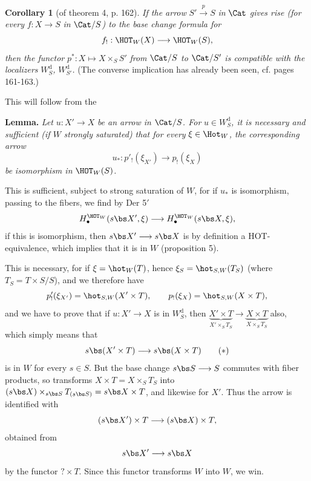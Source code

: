 \noindent{}%
\textbf{Corollary 1} (of theorem 4, p. 162). \textit{If the arrow} $S' \xrightarrow{p} S$ \textit{in} $\Cat$ \textit{gives rise (for every} $f : X \longrightarrow S$ \textit{in} $\Cat/S$\textit{) to the base change formula for}
\[
f_! : \HOT_W(X) \longrightarrow \HOT_W(S),
\]
\textit{then the functor} $p^* : X \longmapsto X \times_S S'$ \textit{from} $\Cat/S$ \textit{to} $\Cat/S'$ \textit{is compatible with the localizers} $W^{\mathrm{d}}_{S}$\textit{,} $W^{\mathrm{d}}_{S'}$\textit{.} (The converse implication has already been seen, cf. pages 161-163.)

This will follow from the

\noindent\textbf{Lemma.} \textit{Let} $u : X' \longrightarrow X$ \textit{be an arrow in} $\Cat/S$\textit{. For} $u \in W^{\mathrm{d}}_{S}$\textit{, it is necessary and sufficient (if $W$} \textit{strongly saturated) that for every} $\xi \in \Hot_W$\textit{, the corresponding arrow}
\[
u_* : p'_!(\xi_{X'}) \longrightarrow p_!(\xi_X)
\]
\textit{be} \textit{isomorphism in} $\HOT_W(S)$\textit{.}

This is sufficient, subject to strong saturation of $W$, for if $u_*$ is isomorphism, passing to the fibers, we find by Der 5$'$
\[
H_\bullet^{\HOT_W}(s\bs X', \xi) \longrightarrow H_\bullet^{\HOT_W}(s\bs X, \xi),
\]
if this is isomorphism, then $s\bs X' \longrightarrow s\bs X$ is by definition a HOT-equivalence, which implies that it is in $W$ (proposition 5).

This is necessary, for if $\xi = \hot_W(T)$, hence $\xi_S = \hot_{S,W}(T_S)$ (where $T_S = T \times S/S$), and we therefore have
\[
p'_!(\xi_{X'}) = \hot_{S,W}(X' \times T), \qquad p_!(\xi_X) = \hot_{S,W}(X \times T),
\]
and we have to prove that if $u : X' \longrightarrow X$ is in $W^{\mathrm{d}}_{S}$, then $\underbrace{X' \times T}_{X' \times_S T_S} \longrightarrow \underbrace{X \times T}_{X \times_S T_S}$ also, which simply means that
\[
s\bs(X' \times T) \longrightarrow s\bs(X \times T) \tag*{$(*)$}
\]
is in $W$ for every $s \in S$. But the base change $s\bs S \longrightarrow S$ commutes with fiber products, so transforms $X \times T = X \times_S T_S$ into $(s\bs X) \times_{s\bs S} T_{(s\bs S)} = s\bs X \times T$, and likewise for $X'$. Thus the arrow is identified with
\[
(s\bs X') \times T \longrightarrow (s\bs X) \times T,
\]
obtained from
\[
s\bs X' \longrightarrow s\bs X
\]
by the functor $? \times T$. Since this functor transforms $W$ into $W$, we win.

